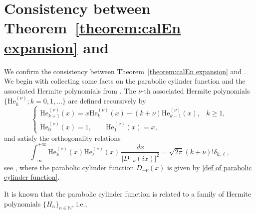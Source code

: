 \documentclass[reqno]{amsart}
\newcommand{\1}{\mathds{1}}
\newcommand{\N}{\mathbb{N}}
\newcommand{\R}{\mathds{R}}
\numberwithin{equation}{section}
\theoremstyle{definition}
\begin{document}
\section{Consistency between Theorem~\ref{theorem:calEn expansion} and 
\cite[Theorem~1.1]{BC2022}}
\label{section:appendix parabolic cylinder function}
We confirm the consistency between Theorem~\ref{theorem:calEn expansion} and 
\cite[Theorem~1.1]{BC2022}. 
We begin with collecting some facts on the parabolic cylinder function and the associated Hermite polynomials from \cite{NIST,Temme,Wunsche,BC2022}.  
The $\nu$-th associated Hermite polynomials $\{\mathrm{He}_k^{(\nu)};k=0,1,\dots\}$ are defined recursively by 
\begin{equation}
\begin{cases}
    \mathrm{He}_{k+1}^{(\nu)}(x)=x\mathrm{He}_{k}^{(\nu)}(x)-(k+\nu)\mathrm{He}_{k-1}^{(\nu)}(x), & k\geq 1, \\
    \mathrm{He}_{0}^{(\nu)}(x)=1,\qquad \mathrm{He}_{1}^{(\nu)}(x)=x,
\end{cases}    
\end{equation}
and satisfy the orthogonality relations 
\begin{equation}
\int_{-\infty}^{+\infty}\mathrm{He}_{k}^{(\nu)}(x)\mathrm{He}_{\ell}^{(\nu)}(x)\,\frac{dx}{|D_{-\nu}(ix)|^2}=\sqrt{2\pi}(k+\nu)!\delta_{k,\ell}, 
\end{equation}
see \cite[Eq. (12.7.2)]{NIST}, where the parabolic cylinder function $D_{-\nu}(x)$ is given by \eqref{def of parabolic cylinder function}.  

It is known that the parabolic cylinder function is related to a family of Hermite polynomials $\{H_n\}_{n\in\N}$, i.e., 
\end{document}
